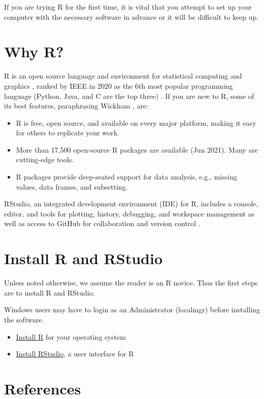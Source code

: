 \documentclass[
]{book}
\providecommand{\tightlist}{%
  \setlength{\itemsep}{0pt}\setlength{\parskip}{0pt}}
\begin{document}
If you are trying R for the first time, it is vital that you attempt to set up your computer with the necessary software in advance or it will be difficult to keep up.

\hypertarget{why-r}{%
\section*{Why R?}\label{why-r}}

R is an open source language and environment for statistical computing and graphics \citep{R-base}, ranked by IEEE in 2020 as the 6th most popular programming language (Python, Java, and C are the top three) \citep{Cass:2020}. If you are new to R, some of its best features, paraphrasing Wickham \citeyearpar{wickham2014advanced}, are:

\begin{itemize}
\tightlist
\item
  R is free, open source, and available on every major platform, making it easy for others to replicate your work.
\item
  More than 17,500 open-source R packages are available (Jun 2021). Many are cutting-edge tools.
\item
  R packages provide deep-seated support for data analysis, e.g., missing values, data frames, and subsetting.
\end{itemize}

RStudio, an integrated development environment (IDE) for R, includes a console, editor, and tools for plotting, history, debugging, and workspace management as well as access to GitHub for collaboration and version control \citep{2016rstudio}.

\hypertarget{install-R-and-RStudio}{%
\section*{Install R and RStudio}\label{install-R-and-RStudio}}

Unless noted otherwise, we assume the reader is an R novice. Thus the first steps are to install R and RStudio.

Windows users may have to login as an Administrator (localmgr) before installing the software.

\begin{itemize}
\tightlist
\item
  \href{https://cloud.r-project.org}{Install R} for your operating system\\
\item
  \href{https://www.rstudio.com/products/rstudio/\#Desktop}{Install RStudio}, a user interface for R
\end{itemize}

\hypertarget{references}{%
\section*{References}\label{references}}

  
\end{document}
